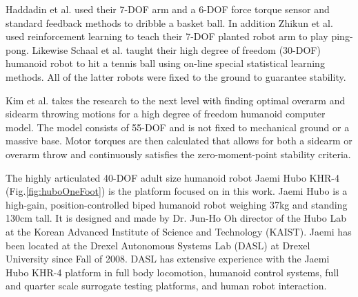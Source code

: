 Haddadin et al.\cite{6094757} used their 7-DOF arm and a 6-DOF force torque sensor and standard feedback methods to dribble a basket ball.  In addition Zhikun et al.\cite{6094892} used reinforcement learning to teach their 7-DOF planted robot arm to play ping-pong.  Likewise Schaal et al.\cite{schaal01/BIRG} taught their high degree of freedom (30-DOF) humanoid robot to hit a tennis ball using on-line special statistical learning methods.  All of the latter robots were fixed to the ground to guarantee stability.

Kim et al. \cite{5686315,JooH2011438} takes the research to the next level with finding optimal overarm and sidearm throwing motions for a high degree of freedom humanoid computer model.  The model consists of 55-DOF and is not fixed to mechanical ground or a massive base.  Motor torques are then calculated that allows for both a sidearm or overarm throw and continuously satisfies the zero-moment-point stability criteria\cite{4309277}.  

The highly articulated 40-DOF adult size humanoid robot Jaemi Hubo KHR-4 (Fig.\ref{fig:huboOneFoot}) is the platform focused on in this work.  Jaemi Hubo is a high-gain, position-controlled biped humanoid robot weighing 37kg and standing 130cm tall.  It is designed and made by Dr. Jun-Ho Oh director of the Hubo Lab at the Korean Advanced Institute of Science and Technology (KAIST).  Jaemi has been located at the Drexel Autonomous Systems Lab (DASL) at Drexel University since Fall of 2008.  DASL has extensive experience with the Jaemi Hubo KHR-4 platform in full body locomotion\cite{5686276}, humanoid control systems\cite{5686325}, full and quarter scale surrogate testing platforms\cite{5379582}, and human robot interaction\cite{5686847,6094987,5928689}.



